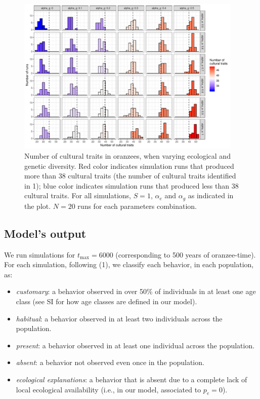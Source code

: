 \documentclass[9pt,twocolumn,twoside,]{pnas-new}
\begin{document}
\begin{figure}[h!]
\begin{center}
\includegraphics[width=10.8cm]{figures/figure_1.pdf}
\caption{Number of cultural traits in oranzees, when varying ecological and genetic diversity. Red color indicates simulation runs that produced more than 38 cultural traits (the number of cultural traits identified in 1); blue color indicates simulation runs that produced less than 38 cultural traits. For all simulations, $S=1$, $\alpha_e$ and $\alpha_g$ as indicated in the plot. $N=20$ runs for each parameters combination.}
\label{Figure1}
\end{center}
\end{figure}

\subsection*{Model's output}\label{format}

We run simulations for \(t_\text{max}=6000\) (corresponding to 500 years
of oranzee-time). For each simulation, following (1), we classify each
behavior, in each population, as:

\begin{itemize}
\item
  \emph{customary}: a behavior observed in over 50\% of individuals in
  at least one age class (see SI for how age classes are defined in our
  model).
\item
  \emph{habitual}: a behavior observed in at least two individuals
  across the population.
\item
  \emph{present}: a behavior observed in at least one individual across
  the population.
\item
  \emph{absent}: a behavior not observed even once in the population.
\item
  \emph{ecological explanations}: a behavior that is absent due to a
  complete lack of local ecological availability (i.e., in our model,
  associated to \(p_e=0\)).
\end{itemize}
\end{document}
